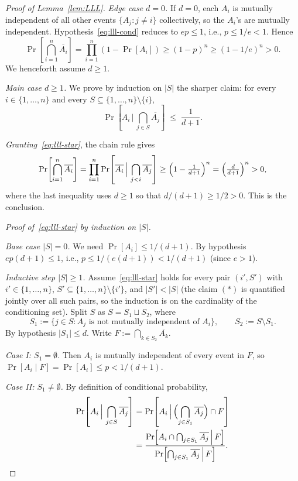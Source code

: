 \documentclass[11pt,reqno,a4paper]{amsart}
\theoremstyle{plain}
\theoremstyle{definition}
\theoremstyle{remark}
\numberwithin{equation}{section}
\begin{document}
\begin{proof}[Proof of Lemma~\ref{lem:LLL}]
\emph{Edge case $d=0$.} If $d=0$, each $A_{i}$ is mutually independent
of all other events $\{A_{j}:j\ne i\}$ collectively, so the $A_{i}$'s
are mutually independent. Hypothesis~\eqref{eq:lll-cond} reduces to
$ep\le 1$, i.e., $p\le 1/e<1$. Hence
\[
\Pr\!\left[\bigcap_{i=1}^{n}\overline{A_{i}}\right]
=\prod_{i=1}^{n}(1-\Pr[A_{i}])
\ge(1-p)^{n}\ge(1-1/e)^{n}>0.
\]
We henceforth assume $d\ge 1$.

\medskip
\emph{Main case $d\ge 1$.} We prove by induction on $|S|$ the sharper
claim: for every $i\in\{1,\ldots,n\}$ and every
$S\subseteq\{1,\ldots,n\}\setminus\{i\}$,
\begin{equation*}
\Pr\!\left[A_{i}\,\Big|\,\bigcap_{j\in S}\overline{A_{j}}\right]
\;\le\;\frac{1}{d+1}.
\tag{$*$}\label{eq:lll-star}
\end{equation*}

\emph{Granting~\eqref{eq:lll-star}}, the chain rule gives
\[
\Pr\!\left[\bigcap_{i=1}^{n}\overline{A_{i}}\right]
=\prod_{i=1}^{n}\Pr\!\left[\overline{A_{i}}\,\Big|\,\bigcap_{j<i}\overline{A_{j}}\right]
\ge\Bigl(1-\tfrac{1}{d+1}\Bigr)^{n}
=\Bigl(\tfrac{d}{d+1}\Bigr)^{n}>0,
\]
where the last inequality uses $d\ge 1$ so that $d/(d+1)\ge 1/2>0$.
This is the conclusion.

\medskip
\emph{Proof of~\eqref{eq:lll-star} by induction on $|S|$.}

\emph{Base case $|S|=0$.} We need
$\Pr[A_{i}]\le 1/(d+1)$. By hypothesis $ep(d+1)\le 1$, i.e.,
$p\le 1/(e(d+1))<1/(d+1)$ (since $e>1$).

\emph{Inductive step $|S|\ge 1$.} Assume~\eqref{eq:lll-star} holds
for every pair $(i',S')$ with $i'\in\{1,\ldots,n\}$,
$S'\subseteq\{1,\ldots,n\}\setminus\{i'\}$, and $|S'|<|S|$
(the claim $(*)$ is quantified jointly over all such pairs, so the
induction is on the cardinality of the conditioning set). Split $S$
as $S=S_{1}\sqcup S_{2}$, where
\[
S_{1}:=\{j\in S:A_{j}\text{ is not mutually independent of }A_{i}\},
\qquad S_{2}:=S\setminus S_{1}.
\]
By hypothesis $|S_{1}|\le d$. Write $F:=\bigcap_{k\in S_{2}}\overline{A_{k}}$.

\emph{Case I: $S_{1}=\emptyset$.} Then $A_{i}$ is mutually independent
of every event in $F$, so $\Pr[A_{i}\mid F]=\Pr[A_{i}]\le p<1/(d+1)$.

\emph{Case II: $S_{1}\ne\emptyset$.} By definition of conditional
probability,
\begin{align}
\Pr\!\left[A_{i}\,\Big|\,\bigcap_{j\in S}\overline{A_{j}}\right]
&=\Pr\!\left[A_{i}\,\Big|\,\Bigl(\bigcap_{j\in S_{1}}\overline{A_{j}}\Bigr)\cap F\right] \notag \\
&=\frac{\Pr\!\left[A_{i}\cap\bigcap_{j\in S_{1}}\overline{A_{j}}\,\Big|\,F\right]}
{\Pr\!\left[\bigcap_{j\in S_{1}}\overline{A_{j}}\,\Big|\,F\right]}.
\label{eq:lll-frac}
\end{align}


\end{proof}
\end{document}
